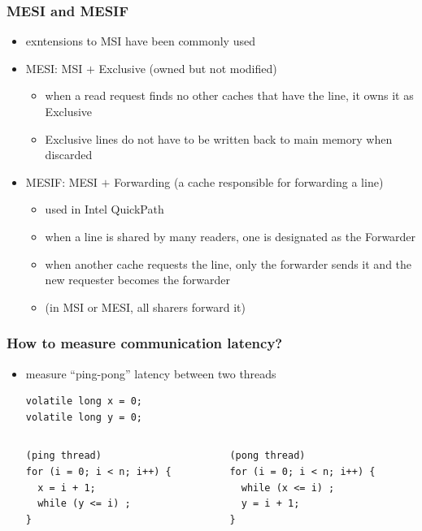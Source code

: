 \documentclass[12pt,dvipdfmx]{beamer}
\newcommand{\ao}[1]{{\color{blue}#1}}
\begin{document}
\begin{frame}
\frametitle{MESI and MESIF}
\begin{itemize}
\item<1-> exntensions to MSI have been commonly used
\item<2-> \ao{MESI:} MSI $+$ \ao{Exclusive (owned but not modified)}
  \begin{itemize}
  \item when a read request finds no other caches that have the line, it owns it as Exclusive
  \item Exclusive lines do not have to be written back to main memory when discarded
  \end{itemize}

\item<3-> \ao{MESIF:} MESI $+$ \ao{Forwarding (a cache responsible for forwarding a line)}
  \begin{itemize}
  \item used in Intel QuickPath
  \item when a line is shared by many readers, one is designated as the Forwarder
  \item when another cache requests the line, only the forwarder sends it 
    and the new requester becomes the forwarder
  \item (in MSI or MESI, all sharers forward it)
  \end{itemize}
\end{itemize}
\end{frame}



\begin{frame}[fragile]
\frametitle{How to measure communication latency?}
\begin{itemize}
\item measure ``ping-pong'' latency between two threads
\begin{lstlisting}
volatile long x = 0;
volatile long y = 0;
\end{lstlisting}
\begin{columns}
\begin{column}{0.4\textwidth}
\begin{lstlisting}
(ping thread)
for (i = 0; i < n; i++) {
  x = i + 1;
  while (y <= i) ; 
}    
\end{lstlisting}
\end{column}
\begin{column}{0.4\textwidth}
\begin{lstlisting}
(pong thread)
for (i = 0; i < n; i++) {
  while (x <= i) ; 
  y = i + 1;
}    
\end{lstlisting}
\end{column}
\end{columns}
\end{itemize}

\begin{center}
\def\svgwidth{0.8\textwidth}
  
\end{center}
\end{frame}
\end{document}
